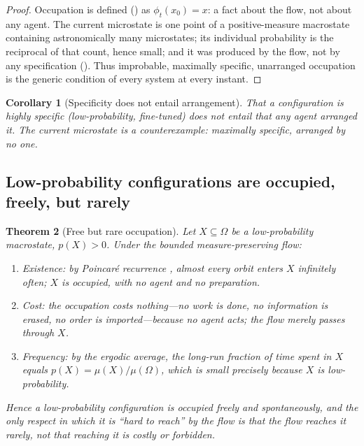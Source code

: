 \documentclass[11pt,a4paper]{article}
\theoremstyle{thmstyle}
\newtheorem{theorem}{Theorem}[section]
\newtheorem{corollary}[theorem]{Corollary}
\theoremstyle{definition}
\theoremstyle{remark}
\newcommand{\Space}{\Omega}
\begin{document}
\begin{proof}
Occupation is defined () as $\phi_t(x_0)=x$: a fact about the flow,
not about any agent. The current microstate is one point of a positive-measure
macrostate containing astronomically many microstates; its individual
probability is the reciprocal of that count, hence small; and it was produced by
the flow, not by any specification (). Thus improbable,
maximally specific, unarranged occupation is the generic condition of every
system at every instant.
\end{proof}

\begin{corollary}[Specificity does not entail arrangement]
\label{cor:spec-not-arr}
That a configuration is highly specific (low-probability, fine-tuned) does not
entail that any agent arranged it. The current microstate is a counterexample:
maximally specific, arranged by no one.
\end{corollary}

\subsection{Low-probability configurations are occupied, freely, but rarely}

\begin{theorem}[Free but rare occupation]
\label{thm:rare}
Let $X\subseteq\Space$ be a low-probability macrostate, $p(X)>0$. Under the
bounded measure-preserving flow:
\begin{enumerate}[label=\textup{(\roman*)},leftmargin=2.4em,nosep]
\item \emph{Existence}: by Poincar\'e recurrence \citep{poincare1890}, almost
every orbit enters $X$ infinitely often; $X$ is occupied, with no agent and no
preparation.
\item \emph{Cost}: the occupation costs nothing---no work is done, no information
is erased, no order is imported---because no agent acts; the flow merely passes
through $X$.
\item \emph{Frequency}: by the ergodic average, the long-run fraction of time
spent in $X$ equals $p(X)=\mu(X)/\mu(\Space)$, which is small precisely because
$X$ is low-probability.
\end{enumerate}
Hence a low-probability configuration is occupied freely and spontaneously, and
the only respect in which it is ``hard to reach'' by the flow is that the flow
reaches it \emph{rarely}, not that reaching it is costly or forbidden.
\end{theorem}
\end{document}
